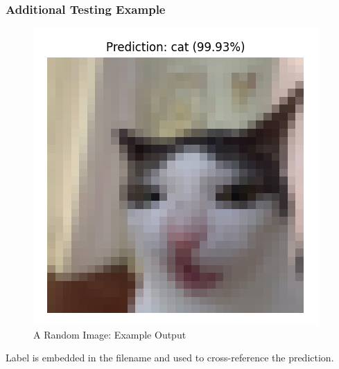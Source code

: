 \begin{frame}
    \frametitle{Additional Testing Example}
    \vspace{-0.25cm}
    \begin{figure}
        \centering
        \includegraphics[height=0.7\textheight]{media/1stAssignment/custom_image.png}
        \vspace{-0.3cm}
        \caption{A Random Image: Example Output}
    \end{figure}
    \vspace{-0.4cm}
    \center \small Label is embedded in the filename and used to cross-reference the prediction.
\end{frame}

